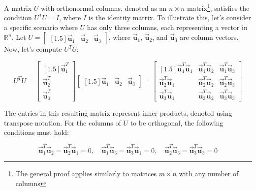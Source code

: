 \documentclass[letter,11pt]{article}
\theoremstyle{definition}
\begin{document}
\begin{tcolorbox}[boxrule=1mm,before=\hfill,after=\hfill,adjusted title={Problem 3 solutions}]
    A matrix $U$ with orthonormal columns, denoted as an $n\times n$ matrix\footnote{The general proof applies similarly to matrices $m\times n$ with any number of columns}, satisfies the condition $U^{T}U = I$, where $I$ is the identity matrix. To illustrate this, let's consider a specific scenario where $U$ has only three columns, each representing a vector in $\mathbb{R}^n$. Let $U = \begin{bmatrix}[1.5] \vec{\boldsymbol{u}}_1 & \vec{\boldsymbol{u}}_2 &  \vec{\boldsymbol{u}}_3 \end{bmatrix}$, where $\vec{\boldsymbol{u}}_1$, $\vec{\boldsymbol{u}}_2$, and $\vec{\boldsymbol{u}}_3$ are column vectors. Now, let's compute $U^{T}U$:

\begin{equation}
    U^{T}U = \begin{bmatrix}[1.5]\vec{\boldsymbol{u}}_{1}^{T}\\ \vec{\boldsymbol{u}}_{2}^{T}\\ \vec{\boldsymbol{u}}_{3}^{T} \end{bmatrix} \begin{bmatrix}[1.5] \vec{\boldsymbol{u}}_1 & \vec{\boldsymbol{u}}_2 & \vec{\boldsymbol{u}}_3 \end{bmatrix} = \begin{bmatrix}[1.5]
    \vec{\boldsymbol{u}}_{1}^{T}\vec{\boldsymbol{u}}_{1} & \vec{\boldsymbol{u}}_{1}^{T}\vec{\boldsymbol{u}}_{2} & \vec{\boldsymbol{u}}_{1}^{T}\vec{\boldsymbol{u}}_{3}\\
    \vec{\boldsymbol{u}}_{2}^{T}\vec{\boldsymbol{u}}_{1} &
    \vec{\boldsymbol{u}}_{2}^{T}\vec{\boldsymbol{u}}_{2} &
    \vec{\boldsymbol{u}}_{2}^{T}\vec{\boldsymbol{u}}_{3}\\
    \vec{\boldsymbol{u}}_{3}^{T}\vec{\boldsymbol{u}}_{1} &
    \vec{\boldsymbol{u}}_{3}^{T}\vec{\boldsymbol{u}}_{2} &
    \vec{\boldsymbol{u}}_{3}^{T}\vec{\boldsymbol{u}}_{3}
\end{bmatrix}
\end{equation}

The entries in this resulting matrix represent inner products, denoted using transpose notation. For the columns of $U$ to be orthogonal, the following conditions must hold:

$$\vec{\boldsymbol{u}}_{1}^{T}\vec{\boldsymbol{u}}_{2} = \vec{\boldsymbol{u}}_{2}^{T}\vec{\boldsymbol{u}}_{1} = 0, \quad \vec{\boldsymbol{u}}_{1}^{T}\vec{\boldsymbol{u}}_{3} = \vec{\boldsymbol{u}}_{3}^{T}\vec{\boldsymbol{u}}_{1} = 0, \quad \vec{\boldsymbol{u}}_{2}^{T}\vec{\boldsymbol{u}}_{3} = \vec{\boldsymbol{u}}_{3}^{T}\vec{\boldsymbol{u}}_{3} = 0$$


\end{tcolorbox}
\end{document}
